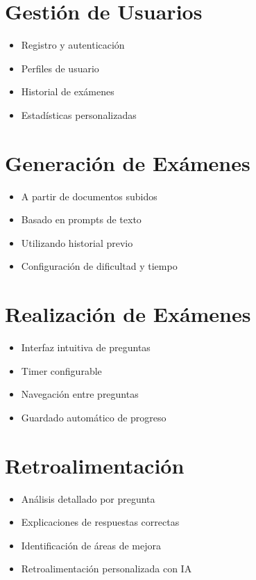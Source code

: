 \documentclass[12pt,a4paper]{report}
\begin{document}
\section{Gestión de Usuarios}
\begin{itemize}
    \item Registro y autenticación
    \item Perfiles de usuario
    \item Historial de exámenes
    \item Estadísticas personalizadas
\end{itemize}

\section{Generación de Exámenes}
\begin{itemize}
    \item A partir de documentos subidos
    \item Basado en prompts de texto
    \item Utilizando historial previo
    \item Configuración de dificultad y tiempo
\end{itemize}

\section{Realización de Exámenes}
\begin{itemize}
    \item Interfaz intuitiva de preguntas
    \item Timer configurable
    \item Navegación entre preguntas
    \item Guardado automático de progreso
\end{itemize}

\section{Retroalimentación}
\begin{itemize}
    \item Análisis detallado por pregunta
    \item Explicaciones de respuestas correctas
    \item Identificación de áreas de mejora
    \item Retroalimentación personalizada con IA
\end{itemize}
\end{document}
